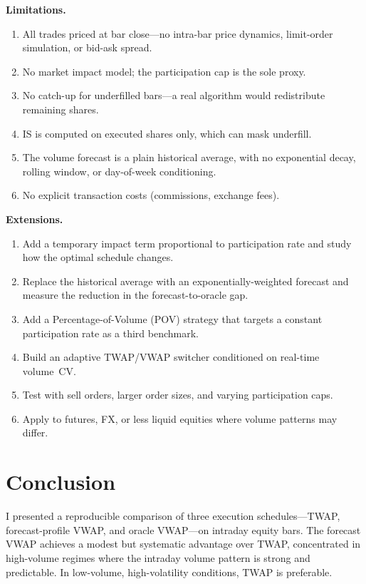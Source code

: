 \documentclass[10pt,twocolumn]{article}
\begin{document}
\textbf{Limitations.}
\begin{enumerate}[nosep]
\item All trades priced at bar close---no intra-bar price dynamics, limit-order simulation, or bid-ask spread.
\item No market impact model; the participation cap is the sole proxy.
\item No catch-up for underfilled bars---a real algorithm would redistribute remaining shares.
\item IS is computed on executed shares only, which can mask underfill.
\item The volume forecast is a plain historical average, with no exponential decay, rolling window, or day-of-week conditioning.
\item No explicit transaction costs (commissions, exchange fees).
\end{enumerate}

\textbf{Extensions.}
\begin{enumerate}[nosep]
\item Add a temporary impact term proportional to participation rate and study how the optimal schedule changes.
\item Replace the historical average with an exponentially-weighted forecast and measure the reduction in the forecast-to-oracle gap.
\item Add a Percentage-of-Volume (POV) strategy that targets a constant participation rate as a third benchmark.
\item Build an adaptive TWAP/VWAP switcher conditioned on real-time volume~CV.
\item Test with sell orders, larger order sizes, and varying participation caps.
\item Apply to futures, FX, or less liquid equities where volume patterns may differ.
\end{enumerate}


\section{Conclusion}

I presented a reproducible comparison of three execution schedules---TWAP, forecast-profile VWAP, and oracle VWAP---on intraday equity bars. The forecast VWAP achieves a modest but systematic advantage over TWAP, concentrated in high-volume regimes where the intraday volume pattern is strong and predictable. In low-volume, high-volatility conditions, TWAP is preferable.
\end{document}
